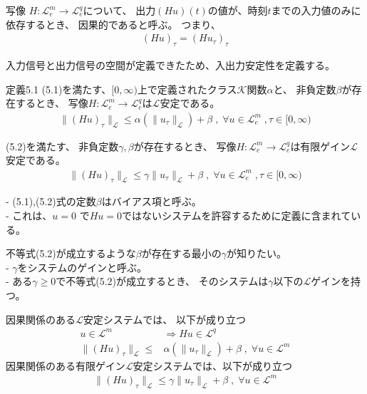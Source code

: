 \documentclass{jsarticle}
\begin{document}
写像 $H\colon \mathcal L^m_e \rightarrow \mathcal L^q_e$について、
出力$(Hu)(t)$の値が、時刻$t$までの入力値のみに依存するとき、
因果的であると呼ぶ。
つまり、
\begin{align}
  (Hu)_\tau = (Hu_\tau)_\tau
\end{align}

入力信号と出力信号の空間が定義できたため、入出力安定性を定義する。

\begin{itembox}[l]{定義5.1}
  (5.1)を満たす、$[0,\infty)$上で定義されたクラス$\mathcal K$関数$\alpha$と、
  非負定数$\beta$が存在するとき、
  写像$H:\mathcal L^m_e \rightarrow \mathcal L^q_e$は$\mathcal L$安定である。
  \begin{align}
    \|(Hu)_\tau\|_\mathcal L \leq \alpha (\|u_\tau\|_\mathcal L)+\beta \;,\; \forall u\in \mathcal L^m_e\;, \tau \in [0,\infty)\tag{5.1}
  \end{align}

  (5.2)を満たす、
  非負定数$\gamma,\beta$が存在するとき、
  写像$H:\mathcal L^m_e \rightarrow \mathcal L^q_e$は有限ゲイン$\mathcal L$安定である。
  \begin{align}
    \|(Hu)_\tau\|_\mathcal L \leq \gamma \|u_\tau\|_\mathcal L+\beta \;,\; \forall u\in \mathcal L^m_e\;, \tau \in [0,\infty)\tag{5.2}
  \end{align}
\end{itembox}
- (5.1),(5.2)式の定数$\beta$はバイアス項と呼ぶ。\\
- これは、$u= 0$ で$Hu=0$ではないシステムを許容するために定義に含まれている。

不等式(5.2)が成立するような$\beta$が存在する最小の$\gamma$が知りたい。\\
- $\gamma$をシステムのゲインと呼ぶ。\\
- ある$\gamma \geq 0$で不等式(5.2)が成立するとき、
そのシステムは$\gamma$以下の$\mathcal L$ゲインを持つ。

因果関係のある$\mathcal L$安定システムでは、
以下が成り立つ
\begin{align}
  u\in \mathcal L^m &\Rightarrow Hu \in  \mathcal L^q\\
  \|(Hu)_\tau\|_\mathcal L \leq &\alpha (\|u_\tau\|_\mathcal L)+\beta \;,\; \forall u\in \mathcal L^m
\end{align}
因果関係のある有限ゲイン$\mathcal L$安定システムでは、以下が成り立つ
\begin{align}
  \|(Hu)_\tau\|_\mathcal L \leq \gamma \|u_\tau\|_\mathcal L+\beta \;,\; \forall u\in \mathcal L^m
\end{align}
\end{document}
